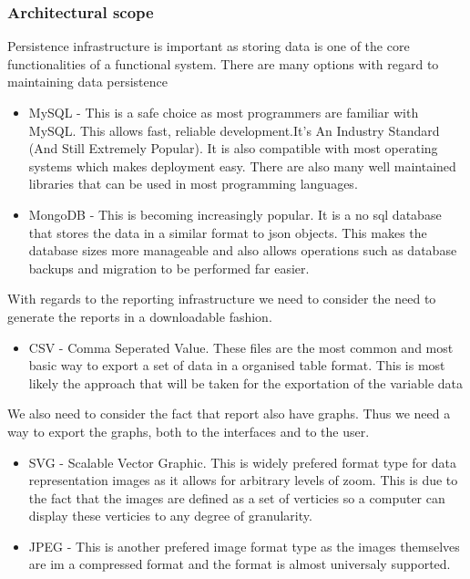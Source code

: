 \documentclass{article}
\begin{document}
			\subsubsection{Architectural scope}
				Persistence infrastructure is important as storing data is one of the core functionalities of a functional system. There are many options with regard to maintaining data persistence
				\begin{itemize}
				  \item MySQL - This is a safe choice as most programmers are familiar with MySQL. This allows fast, reliable development.It’s An Industry Standard (And Still Extremely Popular). It is also compatible with most operating systems which makes deployment easy. There are also many well maintained libraries that can be used in most programming languages.
				  \item MongoDB - This is becoming increasingly popular. It is a no sql database that stores the data in a similar format to json objects. This makes the database sizes more manageable and also allows operations such as database backups and migration to be performed far easier.
				\end{itemize}
				With regards to the reporting infrastructure we need to consider the need to generate the reports in a downloadable fashion.
				\begin{itemize}
				  \item CSV - Comma Seperated Value. These files are the most common and most basic way to export a set of data in a organised table format. This is most likely the approach that will be taken for the exportation of the variable data
				\end{itemize}
				We also need to consider the fact that report also have graphs. Thus we need a way to export the graphs, both to the interfaces and to the user.
				\begin{itemize}
				  \item SVG - Scalable Vector Graphic. This is widely prefered format type for data representation images as it allows for arbitrary levels of zoom. This is due to the fact that the images are defined as a set of verticies so a computer can display these verticies to any degree of granularity.
				  \item JPEG - This is another prefered image format type as the images themselves are im a compressed format and the format is almost universaly supported.
				\end{itemize}
\end{document}
